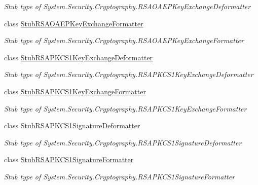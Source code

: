 \begin{DoxyCompactItemize}
\begin{DoxyCompactList}\small\item\em Stub type of System.\-Security.\-Cryptography.\-R\-S\-A\-O\-A\-E\-P\-Key\-Exchange\-Deformatter\end{DoxyCompactList}\item 
class \hyperlink{class_system_1_1_security_1_1_cryptography_1_1_fakes_1_1_stub_r_s_a_o_a_e_p_key_exchange_formatter}{Stub\-R\-S\-A\-O\-A\-E\-P\-Key\-Exchange\-Formatter}
\begin{DoxyCompactList}\small\item\em Stub type of System.\-Security.\-Cryptography.\-R\-S\-A\-O\-A\-E\-P\-Key\-Exchange\-Formatter\end{DoxyCompactList}\item 
class \hyperlink{class_system_1_1_security_1_1_cryptography_1_1_fakes_1_1_stub_r_s_a_p_k_c_s1_key_exchange_deformatter}{Stub\-R\-S\-A\-P\-K\-C\-S1\-Key\-Exchange\-Deformatter}
\begin{DoxyCompactList}\small\item\em Stub type of System.\-Security.\-Cryptography.\-R\-S\-A\-P\-K\-C\-S1\-Key\-Exchange\-Deformatter\end{DoxyCompactList}\item 
class \hyperlink{class_system_1_1_security_1_1_cryptography_1_1_fakes_1_1_stub_r_s_a_p_k_c_s1_key_exchange_formatter}{Stub\-R\-S\-A\-P\-K\-C\-S1\-Key\-Exchange\-Formatter}
\begin{DoxyCompactList}\small\item\em Stub type of System.\-Security.\-Cryptography.\-R\-S\-A\-P\-K\-C\-S1\-Key\-Exchange\-Formatter\end{DoxyCompactList}\item 
class \hyperlink{class_system_1_1_security_1_1_cryptography_1_1_fakes_1_1_stub_r_s_a_p_k_c_s1_signature_deformatter}{Stub\-R\-S\-A\-P\-K\-C\-S1\-Signature\-Deformatter}
\begin{DoxyCompactList}\small\item\em Stub type of System.\-Security.\-Cryptography.\-R\-S\-A\-P\-K\-C\-S1\-Signature\-Deformatter\end{DoxyCompactList}\item 
class \hyperlink{class_system_1_1_security_1_1_cryptography_1_1_fakes_1_1_stub_r_s_a_p_k_c_s1_signature_formatter}{Stub\-R\-S\-A\-P\-K\-C\-S1\-Signature\-Formatter}
\begin{DoxyCompactList}\small\item\em Stub type of System.\-Security.\-Cryptography.\-R\-S\-A\-P\-K\-C\-S1\-Signature\-Formatter\end{DoxyCompactList}\item 

\end{DoxyCompactItemize}
